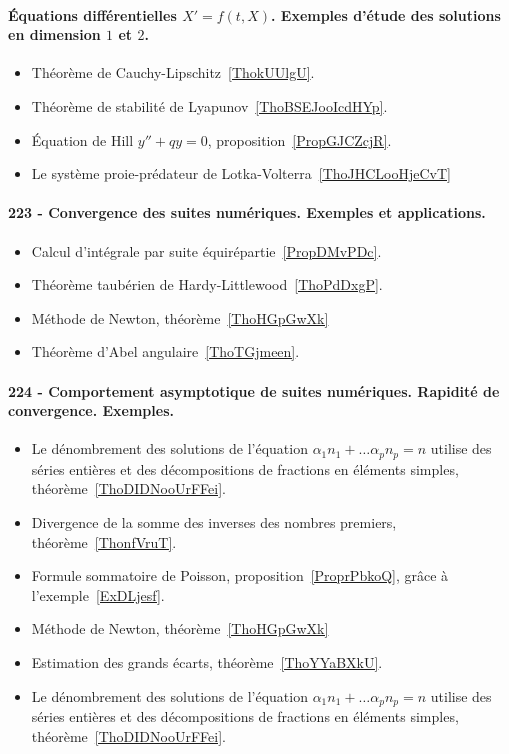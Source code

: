 \paragraph{Équations différentielles $X' = f (t , X )$. Exemples d'étude des solutions en dimension $1$ et $2$.}
\begin{itemize}
    \item Théorème de Cauchy-Lipschitz~\ref{ThokUUlgU}.
    \item Théorème de stabilité de Lyapunov~\ref{ThoBSEJooIcdHYp}.
    \item Équation de Hill \( y''+qy=0\), proposition~\ref{PropGJCZcjR}.
    \item Le système proie-prédateur de Lotka-Volterra~\ref{ThoJHCLooHjeCvT}
\end{itemize}
\paragraph{223 - Convergence des suites numériques. Exemples et applications.}
\begin{itemize}
    \item Calcul d'intégrale par suite équirépartie~\ref{PropDMvPDc}.
    \item Théorème taubérien de Hardy-Littlewood~\ref{ThoPdDxgP}.
    \item Méthode de Newton, théorème~\ref{ThoHGpGwXk}
    \item Théorème d'Abel angulaire~\ref{ThoTGjmeen}.
\end{itemize}
\paragraph{224 - Comportement asymptotique de suites numériques. Rapidité de convergence. Exemples.}
\begin{itemize}
    \item Le dénombrement des solutions de l'équation \( \alpha_1 n_1+\ldots \alpha_pn_p=n\) utilise des séries entières et des décompositions de fractions en éléments simples, théorème~\ref{ThoDIDNooUrFFei}.
    \item Divergence de la somme des inverses des nombres premiers, théorème~\ref{ThonfVruT}.
    \item Formule sommatoire de Poisson, proposition~\ref{ProprPbkoQ}, grâce à l'exemple~\ref{ExDLjesf}.
    \item Méthode de Newton, théorème~\ref{ThoHGpGwXk}
    \item Estimation des grands écarts, théorème~\ref{ThoYYaBXkU}.
    \item Le dénombrement des solutions de l'équation \( \alpha_1 n_1+\ldots \alpha_pn_p=n\) utilise des séries entières et des décompositions de fractions en éléments simples, théorème~\ref{ThoDIDNooUrFFei}.
\end{itemize}
